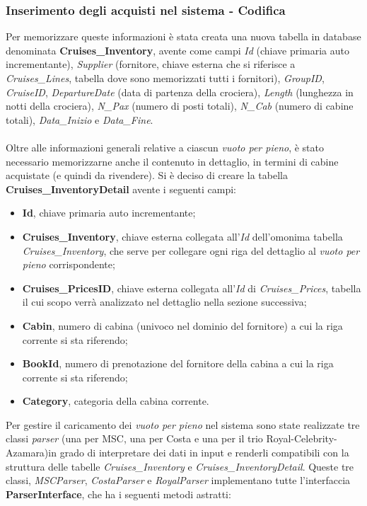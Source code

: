 \subsubsection{Inserimento degli acquisti nel sistema - Codifica}
Per memorizzare queste informazioni è stata creata una nuova tabella in database denominata \textbf{Cruises\_Inventory}, avente come campi \textit{Id} (chiave primaria auto incrementante), \textit{Supplier} (fornitore, chiave esterna che si riferisce a \textit{Cruises\_Lines}, tabella dove sono memorizzati tutti i fornitori), \textit{GroupID}, \textit{CruiseID}, \textit{DepartureDate} (data di partenza della crociera), \textit{Length} (lunghezza in notti della crociera), \textit{N\_Pax} (numero di posti totali), \textit{N\_Cab} (numero di cabine totali), \textit{Data\_Inizio} e \textit{Data\_Fine}.\\
\\
Oltre alle informazioni generali relative a ciascun \textit{vuoto per pieno}, è stato necessario memorizzarne anche il contenuto in dettaglio, in termini di cabine acquistate (e quindi da rivendere). Si è deciso di creare la tabella \textbf{Cruises\_InventoryDetail} avente i seguenti campi:
\begin{itemize}
	\item \textbf{Id}, chiave primaria auto incrementante;
	\item \textbf{Cruises\_Inventory}, chiave esterna collegata all'\textit{Id} dell'omonima tabella \textit{Cruises\_Inventory}, che serve per collegare ogni riga del dettaglio al \textit{vuoto per pieno} corrispondente;
	\item \textbf{Cruises\_PricesID}, chiave esterna collegata all'\textit{Id} di \textit{Cruises\_Prices}, tabella il cui scopo verrà analizzato nel dettaglio nella sezione successiva;
	\item \textbf{Cabin}, numero di cabina (univoco nel dominio del fornitore) a cui la riga corrente si sta riferendo;
	\item \textbf{BookId}, numero di prenotazione del fornitore della cabina a cui la riga corrente si sta riferendo;
	\item \textbf{Category}, categoria della cabina corrente.
\end{itemize}
Per gestire il caricamento dei \textit{vuoto per pieno} nel sistema sono state realizzate tre classi \textit{parser} (una per MSC, una per Costa e una per il trio Royal-Celebrity-Azamara)in grado di interpretare dei dati in input e renderli compatibili con la struttura delle tabelle \textit{Cruises\_Inventory} e \textit{Cruises\_InventoryDetail}. Queste tre classi, \textit{MSCParser}, \textit{CostaParser} e \textit{RoyalParser} implementano tutte l'interfaccia \textbf{ParserInterface}, che ha i seguenti metodi astratti:
